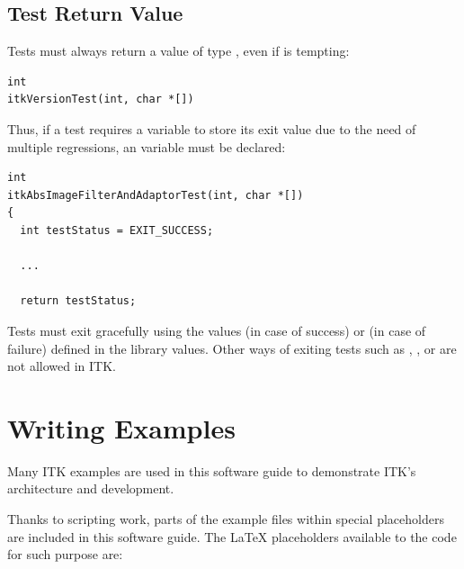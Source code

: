 \subsection{Test Return Value}%
\label{subsec:TestReturnValue}

Tests must always return a value of type ,
even if  is tempting:

\small
\begin{verbatim}
int
itkVersionTest(int, char *[])
\end{verbatim}
\normalsize

Thus, if a test requires a variable to store its exit value due to the need
of multiple regressions, an  variable must be declared:

\small
\begin{verbatim}
int
itkAbsImageFilterAndAdaptorTest(int, char *[])
{
  int testStatus = EXIT_SUCCESS;

  ...

  return testStatus;
\end{verbatim}
\normalsize

Tests must exit gracefully using the values  (in case of
success) or  (in case of failure) defined in the
 library values. Other ways of exiting tests such as
, , or  are not
allowed in ITK.


\section{Writing Examples}%
\label{sec:WritingExamples}

Many ITK examples are used in this software guide to demonstrate ITK's
architecture and development.

Thanks to scripting work, parts of the  example files within
special placeholders are included in this software guide. The \LaTeX
placeholders available to the code for such purpose are:


